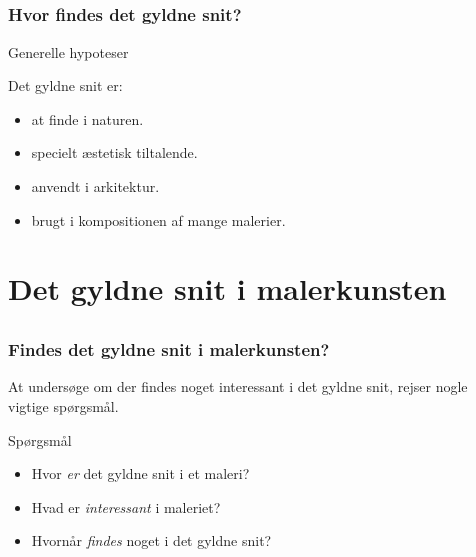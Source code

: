 \documentclass[xcolor=table]{beamer}
\begin{document}
\subsection*{}
\begin{frame}

    \frametitle{Hvor findes det gyldne snit?}

    \begin{block}{Generelle hypoteser}

        Det gyldne snit er:

        \begin{itemize}
            \item <1> at finde i naturen.
            \item <1> specielt æstetisk tiltalende.
            \item <1> anvendt i arkitektur.
            \item <1-2> brugt i kompositionen af mange malerier.
        \end{itemize}

    \end{block}


\end{frame}


\section{Det gyldne snit i malerkunsten}

\subsection*{}
\begin{frame}

    \frametitle{Findes det gyldne snit i malerkunsten?}

    At undersøge om der findes noget interessant i det gyldne snit,
    rejser nogle vigtige spørgsmål.

    \hspace{8em}

    \begin{block}{Spørgsmål}

        \begin{itemize}
            \item Hvor \emph{er} det gyldne snit i et maleri?
            \item Hvad er \emph{interessant} i maleriet?
            \item Hvornår \emph{findes} noget i det gyldne snit?
        \end{itemize}

    \end{block}

\end{frame}
\end{document}
